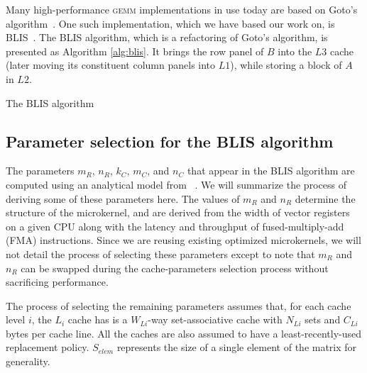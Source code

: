 \documentclass[12pt]{article}
\newcommand*{\TO}{\textbf{to}}
\newcommand*{\gemm}{{\textsc{gemm}}}
\newcommand*{\mycite}[1]{~\cite{#1}}
\begin{document}
Many high-performance \gemm{} implementations in use today are based on Goto's algorithm\mycite{Goto2008}.
One such implementation, which we have based our work on, is BLIS\mycite{VanZee2016}.
The BLIS algorithm, which is a refactoring of Goto's algorithm, is presented as Algorithm \ref{alg:blis}.
It brings the row panel of $B$ into the $L3$ cache (later moving its constituent column panels into $L1$), while storing a block of $A$ in $L2$.
\begin{algorithm}
  \caption{The BLIS algorithm}
  \label{alg:blis}
  \begin{tikzpicture}
    
  \end{tikzpicture}
  \begin{algorithmic}
    \For{$j \gets 0, n_C, \ldots$ \TO{} $n$}
    \For{$p \gets 0, k_C, \ldots$ \TO{} $k$}
    \For{$i \gets 0, m_C, \ldots$ \TO{} $m$}
    \EndFor{}
    \EndFor{}
    \EndFor{}
    \EndProcedure{}
  \end{algorithmic}
\end{algorithm}

\subsection{Parameter selection for the BLIS algorithm}\label{subsec:params}
The parameters $m_R$, $n_R$, $k_C$, $m_C$, and $n_C$ that appear in the BLIS algorithm are computed using an analytical model from \mycite{Low2016}.
We will summarize the process of deriving some of these parameters here.
The values of $m_R$ and $n_R$ determine the structure of the microkernel, and are derived from the width of vector registers on a given CPU along with the latency and throughput of fused-multiply-add (FMA) instructions.
Since we are reusing existing optimized microkernels, we will not detail the process of selecting these parameters except to note that $m_R$ and $n_R$ can be swapped during the cache-parameters selection process without sacrificing performance.

The process of selecting the remaining parameters assumes that, for each cache level $i$, the $L_i$ cache has is a $W_{Li}$-way set-associative cache with $N_{Li}$ sets and $C_{Li}$ bytes per cache line.
All the caches are also assumed to have a least-recently-used replacement policy.
$S_{elem}$ represents the size of a single element of the matrix for generality.
\end{document}
